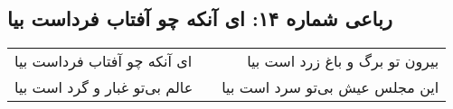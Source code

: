 \begin{center}
\section*{رباعی شماره ۱۴: ای آنکه چو آفتاب فرداست بیا}
\label{sec:0014}
\begin{longtable}{l p{0.5cm} r}
ای آنکه چو آفتاب فرداست بیا
&&
بیرون تو برگ و باغ زرد است بیا
\\
عالم بی‌تو غبار و گرد است بیا
&&
این مجلس عیش بی‌تو سرد است بیا
\\
\end{longtable}
\end{center}
